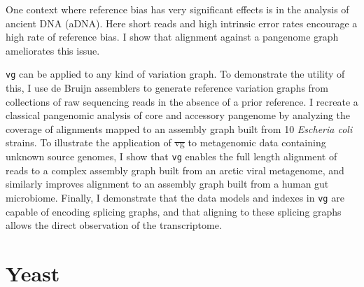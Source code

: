 \documentclass[a4paper,12pt,numbered,oneside]{Classes/PhDThesisPSnPDF}
\providecommand{\DIFaddtex}[1]{{\protect\color{blue}\uwave{#1}}} %
\providecommand{\DIFdeltex}[1]{{\protect\color{red}\sout{#1}}}                      %
\providecommand{\DIFaddbegin}{} %
\providecommand{\DIFaddend}{} %
\providecommand{\DIFdelbegin}{} %
\providecommand{\DIFdelend}{} %
\providecommand{\DIFadd}[1]{\texorpdfstring{\DIFaddtex{#1}}{#1}} %
\providecommand{\DIFdel}[1]{\texorpdfstring{\DIFdeltex{#1}}{}} %
\begin{document}
One context where reference bias has very significant effects is in the analysis of ancient DNA (aDNA).
Here short reads and high intrinsic error rates encourage a high rate of reference bias.
I show that alignment against a pangenome graph ameliorates this issue.

{\tt vg} can be applied to any kind of variation graph.
To demonstrate the utility of this, I use de Bruijn assemblers to generate reference variation graphs from collections of raw sequencing reads in the absence of a prior reference.
I recreate a classical pangenomic analysis of core and accessory pangenome by analyzing the coverage of alignments mapped to an assembly graph built from 10 \emph{Escheria coli} strains.
To illustrate the application of \DIFdelbegin \DIFdel{vg }\DIFdelend \DIFaddbegin {\tt \DIFadd{vg}} \DIFaddend to metagenomic data containing unknown source genomes, I show that {\tt vg} enables the full length alignment of reads to a complex assembly graph built from an arctic viral metagenome, and similarly improves alignment to an assembly graph built from a human gut microbiome.
Finally, I demonstrate that the data models and indexes in {\tt vg} are capable of encoding splicing graphs, and that aligning to these splicing graphs allows the direct observation of the transcriptome.

\section{Yeast}
\end{document}
